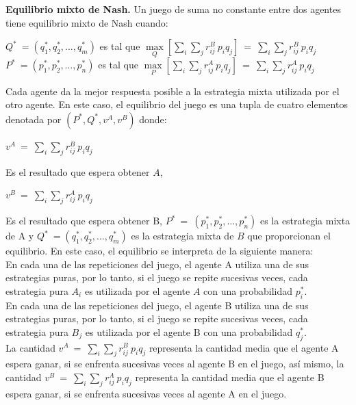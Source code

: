 \begin{definicion}
\textbf{Equilibrio mixto de Nash.}
Un juego de suma no constante entre dos agentes tiene equilibrio mixto de Nash cuando:\\
\begin{center}
    $ Q^*\:=(q_1^*,q_2^*,\ldots,q_m^*) $ es tal que $ \underset{Q}{\max}\left[\underset{i}{\sum} \underset{j}{\sum}r_{ij}^B\:p_iq_j\right] \: = \: \underset{i}{\sum} \underset{j}{\sum}r_{ij}^B\:p_iq_j$\\
    $  P^*\:=(p_1^*,p_2^*,\ldots,p_n^*)$ es tal que $ \underset{P}{\max}\left[\underset{i}{\sum} \underset{j}{\sum}r_{ij}^A\:p_iq_j\right] \: = \: \underset{i}{\sum} \underset{j}{\sum}r_{ij}^A\:p_iq_j$
\end{center}
Cada agente da la mejor  respuesta posible a la estrategia mixta utilizada por el otro agente.  En este caso, el equilibrio del juego es una tupla de cuatro elementos denotada por $(P^*,Q^*,v^A,v^B)$ donde:\\
\begin{center}
 $ v^A \: = \: \underset{i}{\sum} \underset{j}{\sum}r_{ij}^B\:p_iq_j$    \\
\end{center}
Es el resultado que espera obtener $A$,\\
\begin{center}
   $ v^B \:= \: \underset{i}{\sum} \underset{j}{\sum}r_{ij}^A\:p_iq_j$\\ 
\end{center}
Es el resultado que espera obtener B, $P^* \: = \: (p_1^*,p_2^*,\ldots,p_n^*)$  es la estrategia mixta de A y $Q^*\:=(q_1^*,q_2^*,\ldots,q_m^*)$ es la estrategia mixta de $B$ que proporcionan el equilibrio.  En este caso, el equilibrio se interpreta de la siguiente manera:
\\
En cada una de las repeticiones del juego, el agente A utiliza una de sus estrategias puras, por lo tanto, si el juego se repite sucesivas veces, cada estrategia pura $A_i$ es utilizada por el agente $A$ con una probabilidad $p_i^*$.
\\
En cada una de las repeticiones del juego, el agente B utiliza una de sus estrategias puras, por lo tanto, si el juego se repite sucesivas veces, cada estrategia pura $B_j$ es utilizada por el agente B con una probabilidad $q_j^*$.
\\
La cantidad $ v^A \: = \: \underset{i}{\sum} \underset{j}{\sum}r_{ij}^B\:p_iq_j$ representa la cantidad media  que el agente A espera ganar, si se enfrenta sucesivas veces al agente B en el juego, así mismo, la cantidad  $ v^B \:= \: \underset{i}{\sum} \underset{j}{\sum}r_{ij}^A\:p_iq_j$ representa la cantidad media  que el agente B espera ganar, si se enfrenta sucesivas veces al agente A en el juego.
\end{definicion}

